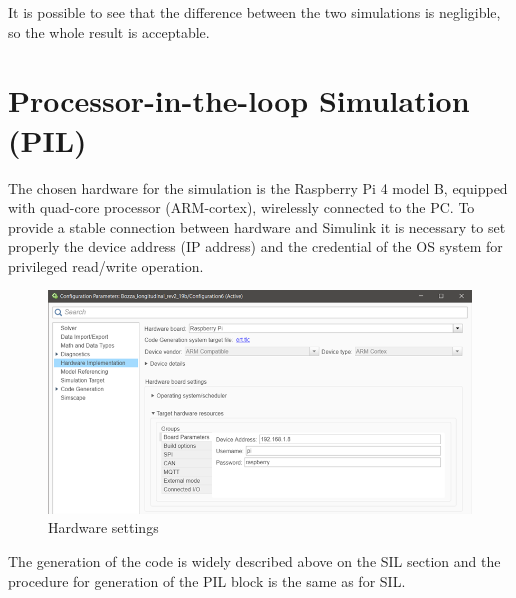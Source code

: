 \documentclass[12pt,a4paper]{report}
\begin{document}
It is possible to see that the difference between the two simulations is negligible, so the whole result is acceptable.
\section{Processor-in-the-loop Simulation (PIL)}

The chosen hardware for the simulation is the Raspberry Pi 4 model B, equipped with quad-core processor (ARM-cortex), wirelessly connected to the PC.
To provide a stable connection between hardware and Simulink it is necessary to set properly the device address (IP address) and the credential of the OS system for privileged read/write operation.


\begin{figure}[htbp]
	\centering
	\includegraphics[scale=0.8]{hw_implementation.png}
	\caption{Hardware settings}
\end{figure} \FloatBarrier

The generation of the code is widely described above on the SIL section and the procedure for generation of the PIL block is the same as for SIL.
\end{document}
